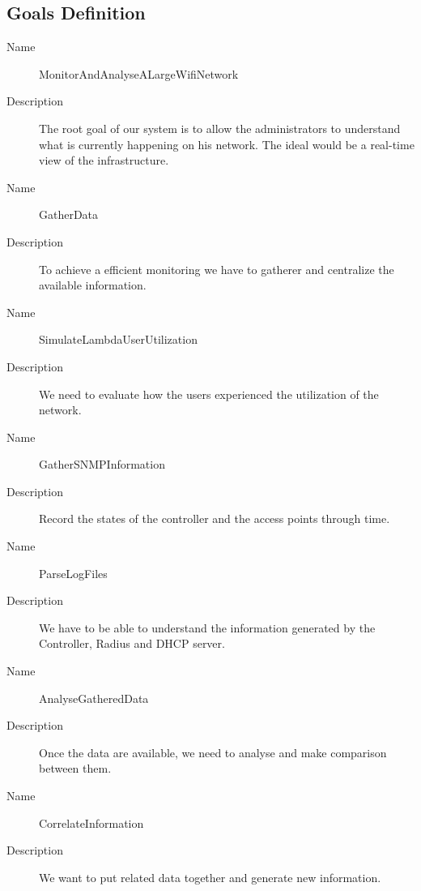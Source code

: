 \subsection{Goals Definition}
\begin{description}
  \item[Name] MonitorAndAnalyseALargeWifiNetwork
  \item[Description] The root goal of our system is to allow the administrators to understand what is currently happening on his network. The ideal would be a real-time view of the infrastructure.
\end{description}

\begin{description}
  \item[Name] GatherData
  \item[Description] To achieve a efficient monitoring we have to gatherer and centralize the available information. 
\end{description}

\begin{description}
  \item[Name] SimulateLambdaUserUtilization
  \item[Description] We need to evaluate how the users experienced the utilization of the network.
\end{description}

\begin{description}
  \item[Name] GatherSNMPInformation
  \item[Description] Record the states of the controller and the access points through time.
\end{description}

\begin{description}
  \item[Name] ParseLogFiles
  \item[Description] We have to be able to understand the information generated by the Controller, Radius and DHCP server.
\end{description}

\begin{description}
  \item[Name] AnalyseGatheredData
  \item[Description] Once the data are available, we need to analyse and make comparison between them.
\end{description}

\begin{description}
  \item[Name] CorrelateInformation
  \item[Description] We want to put related data together and generate new information.
\end{description}

